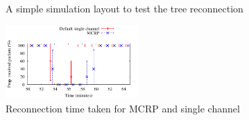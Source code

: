 \begin{figure}
\caption{A simple simulation layout to test the tree reconnection}
\label{fig:reconnectionLayout}
\end{figure}

\begin{figure}
\centering
\includegraphics[width=0.45\textwidth]{figures/reconnect.pdf}
\caption{Reconnection time taken for MCRP and single channel}
\label{fig:reconnection}
\end{figure}

